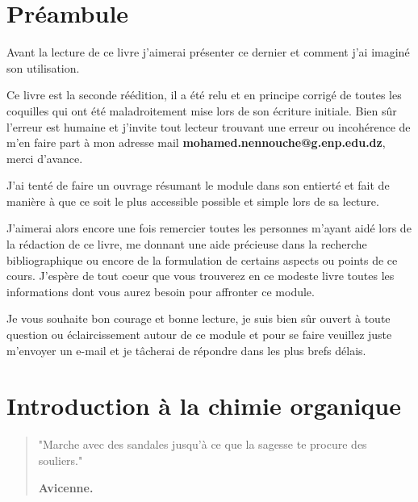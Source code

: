 \documentclass[a4paper, oneside]{book}
\begin{document}
\part*{Préambule}
\label{Préambule}
\vspace*{8cm}
\thispagestyle{empty}
\begin{large}
Avant la lecture de ce livre j'aimerai présenter ce dernier et comment j'ai imaginé son utilisation. 

Ce livre est la seconde réédition, il a été relu et en principe corrigé de toutes les coquilles qui ont été maladroitement mise lors de son écriture initiale. Bien sûr l'erreur est humaine et j'invite tout lecteur trouvant une erreur ou incohérence de m'en faire part à mon adresse mail \textbf{mohamed.nennouche@g.enp.edu.dz}, merci d'avance. 

J'ai tenté de faire un ouvrage résumant le module dans son entierté et fait de manière à que ce soit le plus accessible possible et simple lors de sa lecture. 

J'aimerai alors encore une fois remercier toutes les personnes m'ayant aidé lors de la rédaction de ce livre, me donnant une aide précieuse dans la recherche bibliographique ou encore de la formulation de certains aspects ou points de ce cours. J'espère de tout coeur que vous trouverez en ce modeste livre toutes les informations dont vous aurez besoin pour affronter ce module. 

Je vous souhaite bon courage et bonne lecture, je suis bien sûr ouvert à toute question ou éclaircissement autour de ce module et pour se faire veuillez juste m'envoyer un e-mail et je tâcherai de répondre dans les plus brefs délais. 
\end{large}
\fancyfoot[R]{\textbf{\leftmark}}
\part{Introduction à la chimie organique}
\begin{quotation}
    \vspace*{\fill}
    \LARGE{"Marche avec des sandales jusqu'à ce que la sagesse te procure des souliers."\\
    \begin{center}
        \textbf{Avicenne.}
    \end{center}}
\end{quotation}
\vspace*{\fill}
\newpage
\vspace*{\fill}
\end{document}
